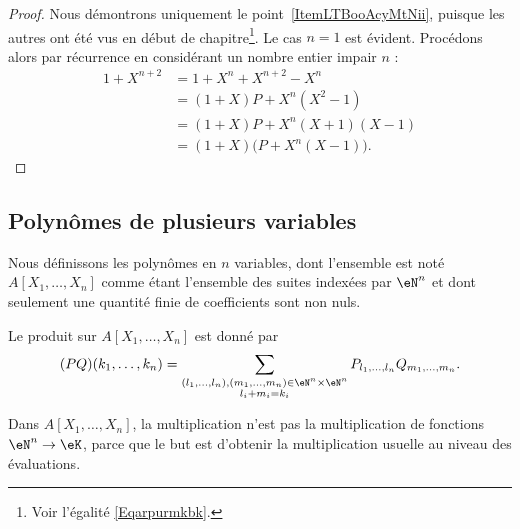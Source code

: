 \begin{proof}
  Nous démontrons uniquement le point~\ref{ItemLTBooAcyMtNii}, puisque
  les autres ont été vus en début de chapitre\footnote{Voir l'égalité
    \eqref{Eqarpurmkbk}.}. Le cas \( n=1\) est évident. Procédons
  alors par récurrence en considérant un nombre entier impair \( n\) :
    \begin{subequations}
        \begin{align}
            1+X^{n+2}&=1+X^n+X^{n+2}-X^n\\
                    &=(1+X)P+X^n(X^2-1)\\
                    &=(1+X)P+X^n(X+1)(X-1)\\
                    &=(1+X)\big( P+X^n(X-1) \big).
        \end{align}
    \end{subequations}
\end{proof}

\subsection{Polynômes de plusieurs variables}

\begin{definition}      \label{DEFooZNHOooCruuwI}
    Nous définissons les polynômes en \( n\) variables, dont l'ensemble est noté \( A[X_1,\ldots, X_n]\) comme étant l'ensemble des suites indexées par \( \eN^n\) et dont seulement une quantité finie de coefficients sont non nuls.

    Le produit sur \( A[X_1,\ldots, X_n]\) est donné par
    \begin{equation}
        (PQ)(k_1,\ldots, k_n)=\sum_{\substack{ (l_1,\ldots, l_n),(m_1,\ldots, m_n)\in \eN^n\times \eN^n   \\l_i+m_i=k_i}}P_{l_1,\ldots, l_n}Q_{m_1,\ldots, m_n}.
        \end{equation}
\end{definition}

\begin{normaltext}
    Dans \( A[X_1,\ldots, X_n]\), la multiplication n'est pas la multiplication de fonctions \( \eN^n\to \eK\), parce que le but est d'obtenir la multiplication usuelle au niveau des évaluations.
\end{normaltext}


